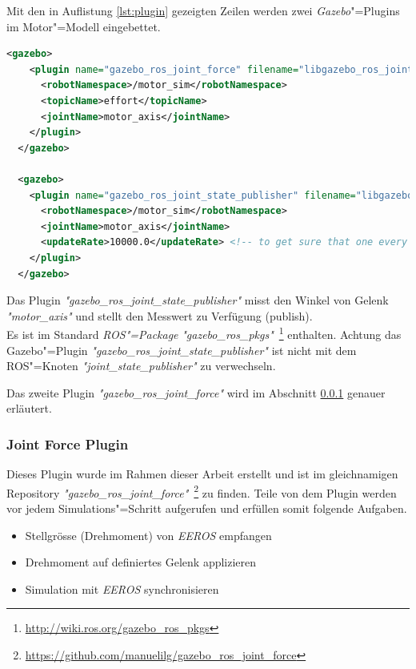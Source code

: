 Mit den in Auflistung \ref{lst:plugin} gezeigten Zeilen werden zwei \textit{Gazebo}"=Plugins im Motor"=Modell eingebettet.
\begin{lstlisting}[language=xml, captionpos=b, caption=Plugin in URDF, label={lst:plugin}, gobble=2]
  <gazebo>
    <plugin name="gazebo_ros_joint_force" filename="libgazebo_ros_joint_force.so">
      <robotNamespace>/motor_sim</robotNamespace>
      <topicName>effort</topicName>
      <jointName>motor_axis</jointName>
    </plugin>
  </gazebo>

  <gazebo>
    <plugin name="gazebo_ros_joint_state_publisher" filename="libgazebo_ros_joint_state_publisher.so">
      <robotNamespace>/motor_sim</robotNamespace>
      <jointName>motor_axis</jointName>
      <updateRate>10000.0</updateRate> <!-- to get sure that one every sim step called, up to 10k -->
    </plugin>
  </gazebo>
\end{lstlisting}
Das Plugin \textit{\textit{"}gazebo\_ros\_joint\_state\_publisher\textit{"}} misst den Winkel von Gelenk \textit{\textit{"}motor\_axis\textit{"}} und stellt den Messwert zu Verfügung (publish).\\
Es ist im Standard \textit{ROS"=Package} \textit{\textit{"}gazebo\_ros\_pkgs\textit{"}}~\footnote{\url{http://wiki.ros.org/gazebo_ros_pkgs}} enthalten.
Achtung das Gazebo"=Plugin \textit{\textit{"}gazebo\_ros\_joint\_state\_publisher\textit{"}} ist nicht mit dem ROS"=Knoten \textit{\textit{"}joint\_state\_publisher\textit{"}} zu verwechseln.

Das zweite Plugin \textit{\textit{"}gazebo\_ros\_joint\_force\textit{"}} wird im Abschnitt \ref{chap:joint-force-plugin} genauer erläutert.

\subsubsection{Joint Force Plugin}
\label{chap:joint-force-plugin}
Dieses Plugin wurde im Rahmen dieser Arbeit erstellt und ist im gleichnamigen Repository \textit{\textit{"}gazebo\_ros\_joint\_force\textit{"}}~\footnote{\url{https://github.com/manuelilg/gazebo_ros_joint_force}} zu finden.
Teile von dem Plugin werden vor jedem Simulations"=Schritt aufgerufen und erfüllen somit folgende Aufgaben.
\begin{itemize}
\item Stellgrösse (Drehmoment) von \textit{EEROS} empfangen
\item Drehmoment auf definiertes Gelenk applizieren
\item Simulation mit \textit{EEROS} synchronisieren
\end{itemize}

